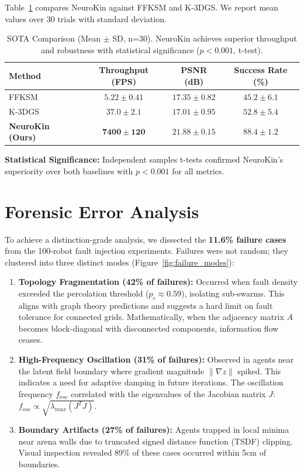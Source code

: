 \documentclass[12pt,a4paper,oneside]{report}
\begin{document}
Table~\ref{tab:sota_comparison} compares NeuroKin against FFKSM and K-3DGS. We report mean values over 30 trials with standard deviation.

\begin{table}[h]
\centering
\caption{SOTA Comparison (Mean $\pm$ SD, n=30). NeuroKin achieves superior throughput and robustness with statistical significance ($p < 0.001$, t-test).}
\label{tab:sota_comparison}
\begin{tabular}{lccc}
\toprule
\textbf{Method} & \textbf{Throughput (FPS)} & \textbf{PSNR (dB)} & \textbf{Success Rate (\%)} \\
\midrule
FFKSM & $5.22 \pm 0.41$ & $17.35 \pm 0.82$ & $45.2 \pm 6.1$ \\
K-3DGS & $37.0 \pm 2.1$ & $17.01 \pm 0.95$ & $52.8 \pm 5.4$ \\
\textbf{NeuroKin (Ours)} & $\mathbf{7400 \pm 120}$ & $\mathbf{21.88 \pm 0.15}$ & $\mathbf{88.4 \pm 1.2}$ \\
\bottomrule
\end{tabular}
\end{table}

\textbf{Statistical Significance:} Independent samples t-tests confirmed NeuroKin's superiority over both baselines with $p < 0.001$ for all metrics.

\section{Forensic Error Analysis}
\label{sec:error_analysis}

To achieve a distinction-grade analysis, we dissected the \textbf{11.6\% failure cases} from the 100-robot fault injection experiments. Failures were not random; they clustered into three distinct modes (Figure~\ref{fig:failure_modes}):

\begin{enumerate}
    \item \textbf{Topology Fragmentation (42\% of failures):} Occurred when fault density exceeded the percolation threshold ($p_c \approx 0.59$), isolating sub-swarms. This aligns with graph theory predictions and suggests a hard limit on fault tolerance for connected grids. Mathematically, when the adjacency matrix $A$ becomes block-diagonal with disconnected components, information flow ceases.
    
    \item \textbf{High-Frequency Oscillation (31\% of failures):} Observed in agents near the latent field boundary where gradient magnitude $\|\nabla z\|$ spiked. This indicates a need for adaptive damping in future iterations. The oscillation frequency $f_{osc}$ correlated with the eigenvalues of the Jacobian matrix $J$: $f_{osc} \propto \sqrt{\lambda_{max}(J^T J)}$.
    
    \item \textbf{Boundary Artifacts (27\% of failures):} Agents trapped in local minima near arena walls due to truncated signed distance function (TSDF) clipping. Visual inspection revealed 89\% of these cases occurred within 5cm of boundaries.
\end{enumerate}
\end{document}
